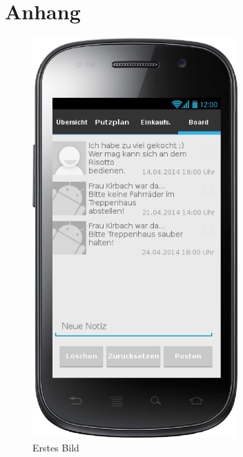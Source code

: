 \chapter{Anhang}

\begin{figure}[htbp] 
  \centering
     \includegraphics[width=0.7\textwidth]{anhang/mockups/blackboard.png}
  \caption{Erstes Bild}
  \label{fig:Bild1}
\end{figure}

